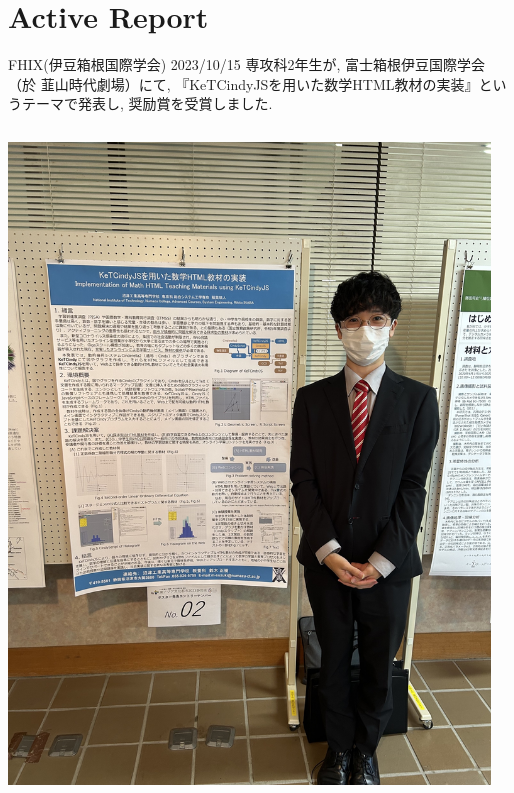 \documentclass[dvipdfmx, unicode]{beamer}
\begin{document}
\section{Active Report}

\begin{frame}[t]{FHIX(伊豆箱根国際学会) 2023/10/15}
  専攻科2年生が, 富士箱根伊豆国際学会（於 韮山時代劇場）にて,
  『KeTCindyJSを用いた数学HTML教材の実装』というテーマで発表し, 奨励賞を受賞しました.
  \begin{columns}[T]
    \begin{column}{0.5\linewidth}
      \centering
      \includegraphics[scale=0.05]{img/ActiveReport/20231015_p.png}
    \end{column}
    \begin{column}{0.5\linewidth}
      \centering

\end{column}
\end{columns}
\end{frame}
\end{document}
